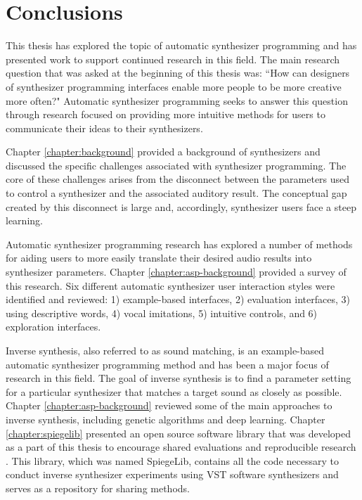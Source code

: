\chapter{Conclusions} %
This thesis has explored the topic of automatic synthesizer programming and has presented work to support continued research in this field. The main research question that was asked at the beginning of this thesis was: ``How can designers of synthesizer programming interfaces enable more people to be more creative more often?" Automatic synthesizer programming seeks to answer this question through research focused on providing more intuitive methods for users to communicate their ideas to their synthesizers.

Chapter \ref{chapter:background} provided a background of synthesizers and discussed the specific challenges associated with synthesizer programming. The core of these challenges arises from the disconnect between the parameters used to control a synthesizer and the associated auditory result. The conceptual gap created by this disconnect is large and, accordingly, synthesizer users face a steep learning. 

Automatic synthesizer programming research has explored a number of methods for aiding users to more easily translate their desired audio results into synthesizer parameters. Chapter \ref{chapter:asp-background} provided a survey of this research. Six different automatic synthesizer user interaction styles were identified and reviewed: 1) example-based interfaces, 2) evaluation interfaces, 3) using descriptive words, 4) vocal imitations, 5) intuitive controls, and 6) exploration interfaces.

Inverse synthesis, also referred to as sound matching, is an example-based automatic synthesizer programming method and has been a major focus of research in this field. The goal of inverse synthesis is to find a parameter setting for a particular synthesizer that matches a target sound as closely as possible. Chapter \ref{chapter:asp-background} reviewed some of the main approaches to inverse synthesis, including genetic algorithms and deep learning. Chapter \ref{chapter:spiegelib} presented an open source software library that was developed as a part of this thesis to encourage shared evaluations and reproducible research \cite{vandewalle2009reproducible}. This library, which was named SpiegeLib, contains all the code necessary to conduct inverse synthesizer experiments using VST software synthesizers and serves as a repository for sharing methods.

